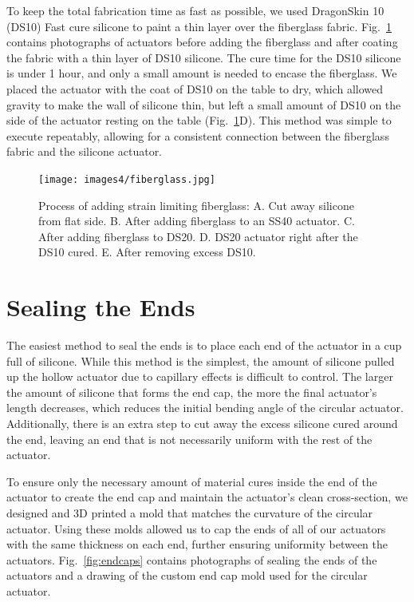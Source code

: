 To keep the total fabrication time as fast as possible, we used DragonSkin 10 (DS10) Fast cure silicone to paint a thin layer over the fiberglass fabric. Fig.~\ref{fig:fiberglass} contains photographs of actuators before adding the fiberglass and after coating the fabric with a thin layer of DS10 silicone. The cure time for the DS10 silicone is under 1 hour, and only a small amount is needed to encase the fiberglass. We placed the actuator with the coat of DS10 on the table to dry, which allowed gravity to make the wall of silicone thin, but left a small amount of DS10 on the side of the actuator resting on the table (Fig.~\ref{fig:fiberglass}D). This method was simple to execute repeatably, allowing for a consistent connection between the fiberglass fabric and the silicone actuator. 

\begin{figure}[ht!]
    \centering
    \texttt{[image: images4/fiberglass.jpg]}
    \caption{Process of adding strain limiting fiberglass: A. Cut away silicone from flat side. B. After adding fiberglass to an SS40 actuator. C. After adding fiberglass to DS20. D. DS20 actuator right after the DS10 cured. E. After removing excess DS10.}
    \label{fig:fiberglass}
\end{figure}

\clearpage
\section{Sealing the Ends}

The easiest method to seal the ends is to place each end of the actuator in a cup full of silicone. While this method is the simplest, the amount of silicone pulled up the hollow actuator due to capillary effects is difficult to control. The larger the amount of silicone that forms the end cap, the more the final actuator's length decreases, which reduces the initial bending angle of the circular actuator. Additionally, there is an extra step to cut away the excess silicone cured around the end, leaving an end that is not necessarily uniform with the rest of the actuator. 

To ensure only the necessary amount of material cures inside the end of the actuator to create the end cap and maintain the actuator's clean cross-section, we designed and 3D printed a mold that matches the curvature of the circular actuator. Using these molds allowed us to cap the ends of all of our actuators with the same thickness on each end, further ensuring uniformity between the actuators. Fig.~\ref{fig:endcaps} contains photographs of sealing the ends of the actuators and a drawing of the custom end cap mold used for the circular actuator. 

